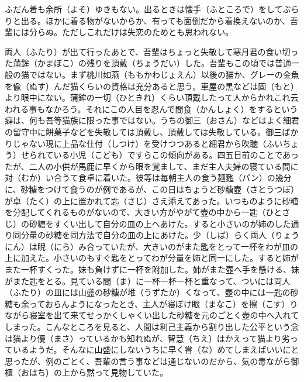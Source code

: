 \documentclass{book}
\begin{document}
ふだん着も余所（よそ）ゆきもない。出るときは懐手（ふところで）をしてぶらりと出る。ほかに着る物がないからか、有っても面倒だから着換えないのか、吾輩には分らぬ。ただしこれだけは失恋のためとも思われない。

両人（ふたり）が出て行ったあとで、吾輩はちょっと失敬して寒月君の食い切った蒲鉾（かまぼこ）の残りを頂戴（ちょうだい）した。吾輩もこの頃では普通一般の猫ではない。まず桃川如燕（ももかわじょえん）以後の猫か、グレーの金魚を偸（ぬす）んだ猫くらいの資格は充分あると思う。車屋の黒などは固（もと）より眼中にない。蒲鉾の一切（ひときれ）くらい頂戴したって人からかれこれ云われる事もなかろう。それにこの人目を忍んで間食（かんしょく）をするという癖は、何も吾等猫族に限った事ではない。うちの御三（おさん）などはよく細君の留守中に餅菓子などを失敬しては頂戴し、頂戴しては失敬している。御三ばかりじゃない現に上品な仕付（しつけ）を受けつつあると細君から吹聴（ふいちょう）せられている小児（こども）ですらこの傾向がある。四五日前のことであったが、二人の小供が馬鹿に早くから眼を覚まして、まだ主人夫婦の寝ている間に対（むか）い合うて食卓に着いた。彼等は毎朝主人の食う麺麭（パン）の幾分に、砂糖をつけて食うのが例であるが、この日はちょうど砂糖壺（さとうつぼ）が卓（たく）の上に置かれて匙（さじ）さえ添えてあった。いつものように砂糖を分配してくれるものがないので、大きい方がやがて壺の中から一匙（ひとさじ）の砂糖をすくい出して自分の皿の上へあけた。すると小さいのが姉のした通り同分量の砂糖を同方法で自分の皿の上にあけた。少（しば）らく両人（りょうにん）は睨（にら）み合っていたが、大きいのがまた匙をとって一杯をわが皿の上に加えた。小さいのもすぐ匙をとってわが分量を姉と同一にした。すると姉がまた一杯すくった。妹も負けずに一杯を附加した。姉がまた壺へ手を懸ける、妹がまた匙をとる。見ている間（ま）に一杯一杯一杯と重なって、ついには両人（ふたり）の皿には山盛の砂糖が堆（うずたか）くなって、壺の中には一匙の砂糖も余っておらんようになったとき、主人が寝ぼけ眼（まなこ）を擦（こす）りながら寝室を出て来てせっかくしゃくい出した砂糖を元のごとく壺の中へ入れてしまった。こんなところを見ると、人間は利己主義から割り出した公平という念は猫より優（まさ）っているかも知れぬが、智慧（ちえ）はかえって猫より劣っているようだ。そんなに山盛にしないうちに早く甞（な）めてしまえばいいにと思ったが、例のごとく、吾輩の言う事などは通じないのだから、気の毒ながら御櫃（おはち）の上から黙って見物していた。
\end{document}
